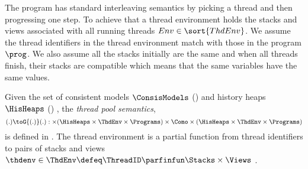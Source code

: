 The program has standard interleaving semantics by picking a thread and then progressing one step.
To achieve that a thread environment holds the stacks and views associated with all running threads \( Env \in \sort{ThdEnv} \).
We assume the thread identifiers in the thread environment match with those in the program \( \prog \).
We also assume all the stacks initially are the same and when all threads finish, their stacks are compatible which means that the same variables have the same values.



\begin{defn} 
\label{def:thread_pool_semantics}
\label{def:program_semantics}
Given the set of consistent models \( \ConsisModels \) () and history heaps \(\HisHeaps\) () , the \emph{thread pool semantics}, 
\[
	(.) \toG{(.)} (.): 
    \times ( \HisHeaps \times \ThdEnv \times \Programs) 
    \times \Como 
    \times ( \HisHeaps \times \ThdEnv \times \Programs) 
\]
is defined in .
The thread environment is a partial function from thread identifiers to pairs of stacks and views \( \thdenv \in \ThdEnv \defeq \ThreadID \parfinfun \Stacks \times \Views \) .
\end{defn}
 

